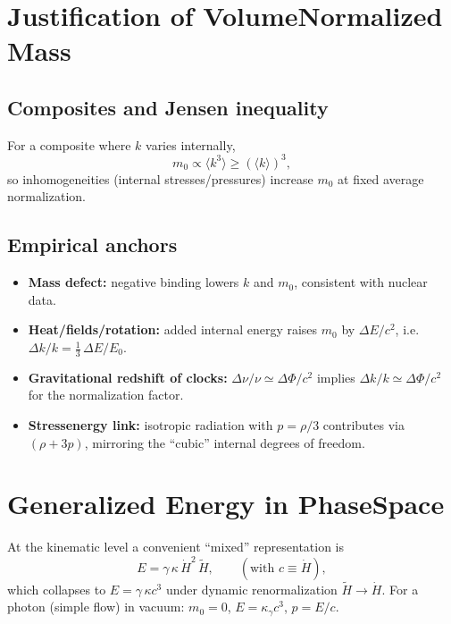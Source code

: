 \documentclass[11pt,a4paper]{article}
\newcommand{\tH}{\tilde{H}}
\newcommand{\ga}{\gamma}
\begin{document}
\section{Justification of Volume\textendash Normalized Mass}
\subsection{Composites and Jensen inequality}
For a composite where $k$ varies internally,
\begin{equation}
  m_0 \propto \langle k^3 \rangle \ge (\langle k \rangle)^3,
\end{equation}
so inhomogeneities (internal stresses/pressures) increase $m_0$ at fixed average normalization.

\subsection{Empirical anchors}
\begin{itemize}
  \item \textbf{Mass defect:} negative binding lowers $k$ and $m_0$, consistent with nuclear data.
  \item \textbf{Heat/fields/rotation:} added internal energy raises $m_0$ by $\Delta E/c^2$, i.e. $\Delta k/k=\tfrac13\,\Delta E/E_0$.
  \item \textbf{Gravitational redshift of clocks:} $\Delta\nu/\nu\simeq\Delta\Phi/c^2$ implies $\Delta k/k\simeq\Delta\Phi/c^2$ for the normalization factor.
  \item \textbf{Stress\textendash energy link:} isotropic radiation with $p=\rho/3$ contributes via $(\rho+3p)$, mirroring the ``cubic'' internal degrees of freedom.
\end{itemize}

\section{Generalized Energy in Phase\textendash Space}
At the kinematic level a convenient ``mixed'' representation is
\begin{equation}
  E = \ga\,\kappa\,\dot H^{2}\,\tH,\qquad (\text{with } c\equiv\dot H),
  \label{eq:mixed}
\end{equation}
which collapses to $E=\ga\,\kappa c^3$ under dynamic renormalization $\tH\to\dot H$. For a photon (simple flow) in vacuum: $m_0=0$, $E=\kappa_\gamma c^3$, $p=E/c$.
\end{document}

